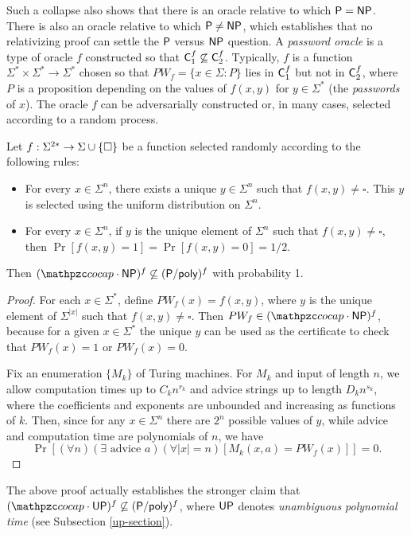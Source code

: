 Such a collapse also shows that there is an oracle relative to which $\mathsf{P}=\mathsf{NP}$. 
There is also an oracle relative to which $\mathsf{P}\neq\mathsf{NP}$, which establishes that no 
relativizing proof can settle the $\mathsf{P}$ versus $\mathsf{NP}$ question. A \textit{password oracle} is a type of oracle $f$ constructed so that
$\mathsf{C}_1^f\not\subseteq\mathsf{C}_2^f$. Typically, $f$ is a function
$\Sigma^*\times\Sigma^*\rightarrow\Sigma^*$ chosen so that
$PW_f=\{x\in\Sigma:P\}$ lies in $\mathsf{C}_1^f$ but not in $\mathsf{C}_2^f$, where $P$ is a
proposition depending on the values of $f(x,y)$ for $y\in\Sigma^*$ (the
\textit{passwords} of $x$). The oracle $f$ can be adversarially constructed or,
in many cases, selected according to a random process.

\begin{theorem}
Let $f:\Sigma^{2*}\rightarrow\Sigma\cup\{\square\}$ be a function selected randomly
according to the following rules:
\begin{itemize}
\item For every $x\in\Sigma^n$, there exists a unique $y\in\Sigma^n$ such that
$f(x,y)\neq\square$. This $y$ is selected using the uniform distribution on
$\Sigma^n$.
\item  For every $x\in\Sigma^n$, if $y$ is the unique element of $\Sigma^n$ such
that $f(x,y)\neq\square$, then $\Pr[f(x,y)=1]=\Pr[f(x,y)=0]=1/2$.
\end{itemize}
Then $(\cocap\cdot\msf{NP})^f\not\subseteq(\sP/\poly)^f$ with probability 1.
\end{theorem}

\begin{proof}
For each $x\in\Sigma^*$, define $PW_f(x)=f(x,y)$, where $y$ is the unique
element of $\Sigma^{|x|}$ such that $f(x,y)\neq\square$. Then
$PW_f\in(\cocap\cdot\msf{NP})^f$, because for a given $x\in\Sigma^*$ the unique
$y$ can be used as the certificate to check that $PW_f(x)=1$ or $PW_f(x)=0$.

Fix an enumeration $\{M_k\}$ of Turing machines. For $M_k$ and input of length
$n$, we allow computation times up to $C_kn^{r_k}$ and advice strings up to
length $D_kn^{s_k}$, where the coefficients and exponents are unbounded and
increasing as functions of $k$. Then, since for any $x\in\Sigma^n$ there are
$2^n$ possible values of $y$, while advice and computation time are polynomials
of $n$, we have
\[
\Pr[(\forall n)(\exists\text{ advice }a)(\forall|x|=n)[M_k(x,a)=PW_f(x)]]=0.
\]
\end{proof}

The above proof actually establishes the stronger claim that 
$(\cocap\cdot\msf{UP})^f\not\subseteq(\sP/\poly)^f$, where $\mathsf{UP}$ denotes 
\textit{unambiguous polynomial time} (see Subsection \ref{up-section}).